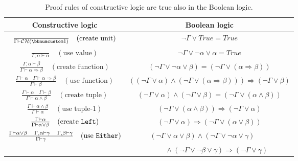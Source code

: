 \begin{table}
\begin{centering}
\begin{tabular}{|c|c|}
\hline 
\textbf{\small{}Constructive logic} & \textbf{\small{}Boolean logic}\tabularnewline
\hline 
\hline 
{\small{}$\frac{}{\Gamma\vdash{\cal CH}(\bbnum 1)}\quad(\text{create unit})$} & {\small{}$\neg\Gamma\vee True=True$}\tabularnewline
\hline 
{\small{}$\frac{~}{\Gamma,\alpha\vdash\alpha}\quad(\text{use value})$} & {\small{}$\neg\Gamma\vee\neg\alpha\vee\alpha=True$}\tabularnewline
\hline 
{\small{}$\frac{\Gamma,\alpha\vdash\beta}{\Gamma\vdash\alpha\Rightarrow\beta}\quad(\text{create function})$} & {\small{}$\left(\neg\Gamma\vee\neg\alpha\vee\beta\right)=\left(\neg\Gamma\vee\left(\alpha\Rightarrow\beta\right)\right)$}\tabularnewline
\hline 
{\small{}$\frac{\Gamma\vdash\alpha\quad\Gamma\vdash\alpha\Rightarrow\beta}{\Gamma\vdash\beta}\quad(\text{use function})$} & {\small{}$\left(\left(\neg\Gamma\vee\alpha\right)\wedge\left(\neg\Gamma\vee\left(\alpha\Rightarrow\beta\right)\right)\right)\Rightarrow\left(\neg\Gamma\vee\beta\right)$}\tabularnewline
\hline 
{\small{}$\frac{\Gamma\vdash\alpha\quad\Gamma\vdash\beta}{\Gamma\vdash\alpha\wedge\beta}\quad(\text{create tuple})$} & {\small{}$\left(\neg\Gamma\vee\alpha\right)\wedge\left(\neg\Gamma\vee\beta\right)=\left(\neg\Gamma\vee\left(\alpha\wedge\beta\right)\right)$}\tabularnewline
\hline 
{\small{}$\frac{\Gamma\vdash\alpha\wedge\beta}{\Gamma\vdash\alpha}\quad(\text{use tuple-}1)$} & {\small{}$\left(\neg\Gamma\vee\left(\alpha\wedge\beta\right)\right)\Rightarrow\left(\neg\Gamma\vee\alpha\right)$}\tabularnewline
\hline 
{\small{}$\frac{\Gamma\vdash\alpha}{\Gamma\vdash\alpha\vee\beta}\quad(\text{create \texttt{Left}})$} & {\small{}$\left(\neg\Gamma\vee\alpha\right)\Rightarrow\left(\neg\Gamma\vee\left(\alpha\vee\beta\right)\right)$}\tabularnewline
\hline 
{\small{}$\frac{\Gamma\vdash\alpha\vee\beta\quad\Gamma,\alpha\vdash\gamma\quad\Gamma,\beta\vdash\gamma}{\Gamma\vdash\gamma}\quad(\text{use \texttt{Either}})$} & {\small{}$\left(\neg\Gamma\vee\alpha\vee\beta\right)\wedge\left(\neg\Gamma\vee\neg\alpha\vee\gamma\right)\quad\quad$}\tabularnewline
 & $\quad\quad\wedge\left(\neg\Gamma\vee\neg\beta\vee\gamma\right)\Rightarrow\left(\neg\Gamma\vee\gamma\right)$\tabularnewline
\hline 
\end{tabular}
\par\end{centering}
\caption{Proof rules of constructive logic are true also in the Boolean logic.\label{tab:Proof-rules-of-constructive-and-boolean}}
\end{table}

